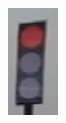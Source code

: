 \begin{figure}[h]
\begin{subfigure}[b]{0.15\linewidth}
    \caption{}
  \end{subfigure}
  \begin{subfigure}[b]{0.15\linewidth}
      \includegraphics[width=\linewidth]{figures/signs/TrafficLightRed.jpg}

\end{subfigure}
\end{figure}
